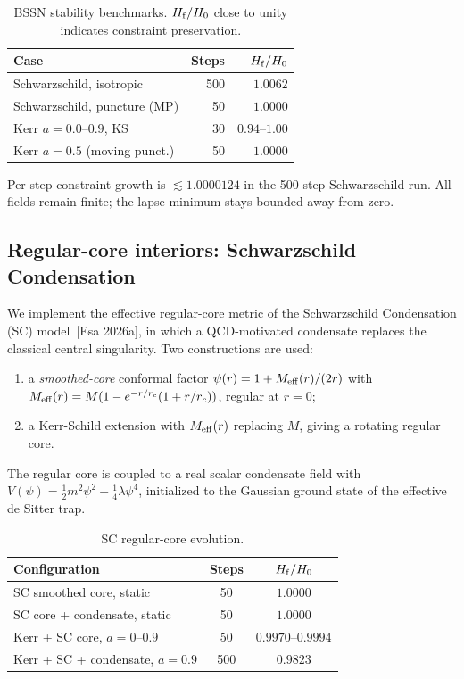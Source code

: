 \begin{table}[t]
\centering
\caption{BSSN stability benchmarks. $H_{\rm f}/H_0$ close to unity
indicates constraint preservation.}
\label{tab:bssn_benchmarks}
\begin{tabular}{lrr}
\hline
Case & Steps & $H_{\rm f}/H_0$ \\
\hline
Schwarzschild, isotropic       & 500 & $1.0062$ \\
Schwarzschild, puncture (MP)   &  50 & $1.0000$ \\
Kerr $a{=}0.0$--$0.9$, KS      &  30 & $0.94$--$1.00$ \\
Kerr $a{=}0.5$ (moving punct.) &  50 & $1.0000$ \\
\hline
\end{tabular}
\end{table}

Per-step constraint growth is $\lesssim 1.0000124$ in the 500-step
Schwarzschild run. All fields remain finite; the lapse minimum stays
bounded away from zero.

\subsection{Regular-core interiors: Schwarzschild Condensation}

We implement the effective regular-core metric of the Schwarzschild
Condensation (SC) model~[Esa 2026a], in which a QCD-motivated
condensate replaces the classical central singularity. Two
constructions are used:

\begin{enumerate}
\item a \emph{smoothed-core} conformal factor
      $\psi(r) = 1 + M_{\rm eff}(r)/(2r)$ with
      $M_{\rm eff}(r) = M(1 - e^{-r/r_c}(1 + r/r_c))$, regular at
      $r = 0$;
\item a Kerr-Schild extension with $M_{\rm eff}(r)$ replacing $M$,
      giving a rotating regular core.
\end{enumerate}

The regular core is coupled to a real scalar condensate field with
$V(\psi) = \tfrac12 m^2\psi^2 + \tfrac14\lambda\psi^4$, initialized to
the Gaussian ground state of the effective de Sitter trap.

\begin{table}[t]
\centering
\caption{SC regular-core evolution.}
\label{tab:sc}
\begin{tabular}{lcc}
\hline
Configuration & Steps & $H_{\rm f}/H_0$ \\
\hline
SC smoothed core, static        & 50  & $1.0000$ \\
SC core + condensate, static    & 50  & $1.0000$ \\
Kerr + SC core, $a{=}0$--$0.9$  & 50  & $0.9970$--$0.9994$ \\
Kerr + SC + condensate, $a{=}0.9$ & 500 & $\mathbf{0.9823}$ \\
\hline
\end{tabular}
\end{table}

